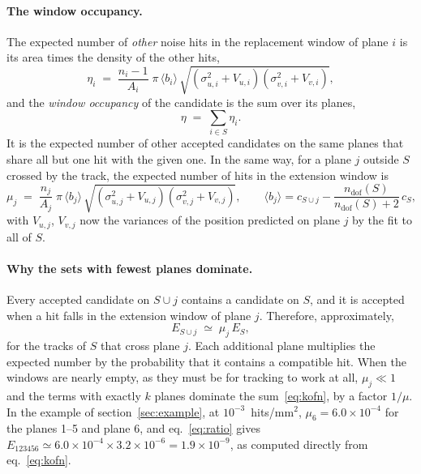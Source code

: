 \IfFileExists{jinst.cls}{\documentclass[a4paper,11pt]{jinst}}
\newcommand{\ndof}{n_\mathrm{dof}}
\begin{document}
\paragraph{The window occupancy.} The expected number of \emph{other} noise hits in the
replacement window of plane $i$ is its area times the density of the other hits,
\begin{equation}
  \eta_i \;=\; \frac{n_i-1}{A_i}\;\pi\,\langle b_i\rangle\,
  \sqrt{(\sigma_{u,i}^2+V_{u,i})(\sigma_{v,i}^2+V_{v,i})} ,
  \label{eq:eta_i}
\end{equation}
and the \emph{window occupancy} of the candidate is the sum over its planes,
\begin{equation}
  \eta \;=\; \sum_{i\in S}\eta_i .
  \label{eq:eta}
\end{equation}
It is the expected number of other accepted candidates on the same planes that share all but
one hit with the given one. In the same way, for a plane $j$ outside $S$ crossed by the
track, the expected number of hits in the extension window is
\begin{equation}
  \mu_j \;=\; \frac{n_j}{A_j}\;\pi\,\langle b_j\rangle\,\sqrt{(\sigma_{u,j}^2+V_{u,j})(\sigma_{v,j}^2+V_{v,j})},
  \qquad \langle b_j\rangle = c_{S\cup j}-\frac{\ndof(S)}{\ndof(S)+2}\,c_S ,
  \label{eq:mu}
\end{equation}
with $V_{u,j}$, $V_{v,j}$ now the variances of the position predicted on plane $j$ by the fit to
all of $S$.

\paragraph{Why the sets with fewest planes dominate.} Every accepted candidate on $S\cup j$
contains a candidate on $S$, and it is accepted when a hit falls in the extension window of
plane $j$. Therefore, approximately,
\begin{equation}
  E_{S\cup j} \;\simeq\; \mu_j\,E_S ,
  \label{eq:ratio}
\end{equation}
for the tracks of $S$ that cross plane $j$. Each additional plane multiplies the expected number
by the probability that it contains a compatible hit. When the windows are nearly empty, as they
must be for tracking to work at all, $\mu_j\ll1$ and the terms with exactly $k$ planes dominate
the sum~\eqref{eq:kofn}, by a factor $1/\mu$. In the example of section~\ref{sec:example}, at
$10^{-3}$~hits/mm$^2$, $\mu_6=6.0\times10^{-4}$ for the planes 1--5 and plane 6, and
eq.~\eqref{eq:ratio} gives $E_{123456}\simeq 6.0\times10^{-4}\times3.2\times10^{-6}
=1.9\times10^{-9}$, as computed directly from eq.~\eqref{eq:kofn}.
\end{document}
